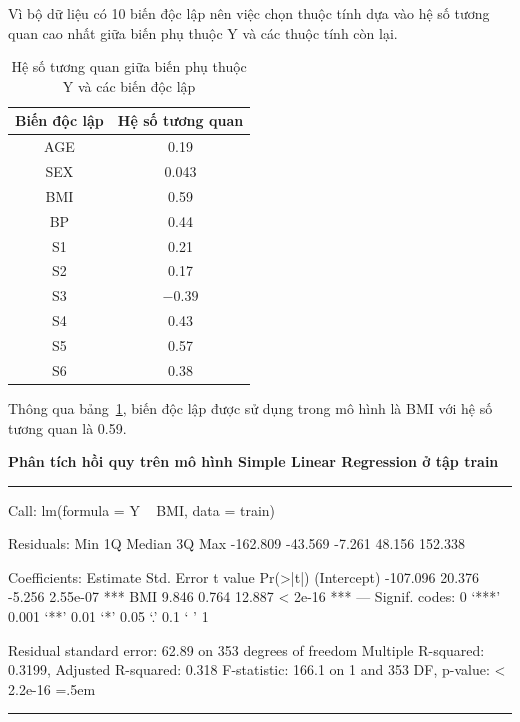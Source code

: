 \documentclass[runningheads]{llncs}
\newenvironment{lcverbatim}
 {\SaveVerbatim{cverb}}
 {\endSaveVerbatim
  \flushleft\fboxrule=0pt\fboxsep=.5em
  \colorbox{cverbbg}{%
    \makebox[\dimexpr\linewidth-2\fboxsep][l]{\BUseVerbatim{cverb}}%
  }
  \endflushleft
}
\begin{document}
Vì bộ dữ liệu có 10 biến độc lập nên việc chọn thuộc tính dựa vào hệ số tương quan cao nhất giữa biến phụ thuộc Y và các thuộc tính còn lại. 

\begin{table}[H]
	\setlength{\tabcolsep}{0.5em}
	\renewcommand{\arraystretch}{1.4}
	\begin{center}
		\caption{Hệ số tương quan giữa biến phụ thuộc Y và các biến độc lập}\label{tab:corry}
		\begin{tabular}{|c|c|}
			\hline
			Biến độc lập&Hệ số tương quan\\
			\hline
			AGE&0.19\\
			\hline
			SEX&0.043\\
			\hline
			BMI&0.59\\
			\hline
			BP&	0.44\\
			\hline
			S1&	0.21\\
			\hline
			S2&0.17\\
			\hline
			S3&$-0.39$\\
			\hline
			S4&0.43\\
			\hline
			S5&0.57\\
			\hline
			S6&0.38\\
			\hline
		\end{tabular}			
	\end{center}
\end{table}
Thông qua bảng~\ref{tab:corry}, biến độc lập được sử dụng trong mô hình là BMI với hệ số tương quan là 0.59. 

\vspace{0.5cm}
\textbf{Phân tích hồi quy trên mô hình Simple Linear Regression ở tập train}
\vspace{0.5cm}
\hrule
\begin{lcverbatim}
Call:
lm(formula = Y ~ BMI, data = train)

Residuals:
     Min       1Q   Median       3Q      Max 
-162.809  -43.569   -7.261   48.156  152.338 

Coefficients:
            Estimate Std. Error t value Pr(>|t|)    
(Intercept) -107.096     20.376  -5.256 2.55e-07 ***
BMI            9.846      0.764  12.887  < 2e-16 ***
---
Signif. codes:  0 ‘***’ 0.001 ‘**’ 0.01 ‘*’ 0.05 ‘.’ 0.1 ‘ ’ 1

Residual standard error: 62.89 on 353 degrees of freedom
Multiple R-squared:  0.3199,	Adjusted R-squared:  0.318 
F-statistic: 166.1 on 1 and 353 DF,  p-value: < 2.2e-16
\end{lcverbatim}
\hrule
\vspace{0.5cm}
\end{document}
